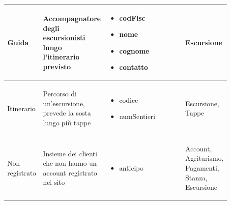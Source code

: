 \documentclass[12pt,a4paper]{article}
\begin{document}
\begin{center}
\begin{longtable}{|p{0.14\linewidth}|p{0.20\linewidth}|p{0.36\linewidth}|p{0.20\linewidth}|}
\hline
Guida				 	& \begin{flushleft}\vspace{-25pt} Accompagna\-tore degli escursionisti lungo l'itinerario previsto \end{flushleft}
					& \begin{itemize}
						\setlength{\itemindent}{-1em}
						\vspace{-25pt}
						\setlength\itemsep{-0.25em}
						\item codFisc
						\item nome
						\item cognome
						\item contatto
					\end{itemize}
					& \begin{flushleft}\vspace{-25pt} Escursione \end{flushleft} \\ 

\hline
Itinerario				 	& \begin{flushleft}\vspace{-25pt} Percorso di un'escursione, prevede la sosta lungo più tappe \end{flushleft}
					& \begin{itemize}
						\setlength{\itemindent}{-1em}
						\vspace{-25pt}
						\setlength\itemsep{-0.25em}
						\item codice
						\item numSentieri
					\end{itemize}
					& \begin{flushleft}\vspace{-25pt} Escursione, Tappe \end{flushleft} \\ 

\hline
Non registrato				 	& \begin{flushleft}\vspace{-25pt} Insieme dei clienti che non hanno un account registrato nel sito \end{flushleft}
					& \begin{itemize}
						\setlength{\itemindent}{-1em}
						\vspace{-25pt}
						\setlength\itemsep{-0.25em}
						\item anticipo
					\end{itemize}
					& \begin{flushleft}\vspace{-25pt} Account, Agriturismo, Pagamenti, Stanza, Escursione \end{flushleft} \\ 


\end{longtable}
\end{center}
\end{document}
